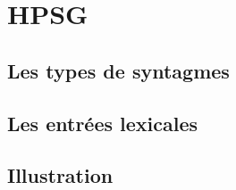 %
\section{HPSG}

\subsection{Les types de syntagmes}



\subsection{Les entrées lexicales}

\subsection{Illustration}

